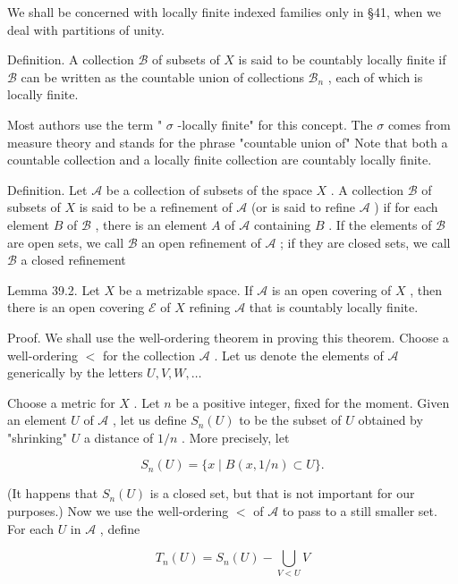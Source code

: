 \documentclass[10pt]{article}
\begin{document}
We shall be concerned with locally finite indexed families only in §41, when we deal with partitions of unity.

Definition. A collection \(\mathcal{B}\) of subsets of \(X\) is said to be countably locally finite if \(\mathcal{B}\) can be written as the countable union of collections \({\mathcal{B}}_{n}\) , each of which is locally finite.

Most authors use the term " \(\sigma\) -locally finite" for this concept. The \(\sigma\) comes from measure theory and stands for the phrase "countable union of" Note that both a countable collection and a locally finite collection are countably locally finite.

Definition. Let \(\mathcal{A}\) be a collection of subsets of the space \(X\) . A collection \(\mathcal{B}\) of subsets of \(X\) is said to be a refinement of \(\mathcal{A}\) (or is said to refine \(\mathcal{A}\) ) if for each element \(B\) of \(\mathcal{B}\) , there is an element \(A\) of \(\mathcal{A}\) containing \(B\) . If the elements of \(\mathcal{B}\) are open sets, we call \(\mathcal{B}\) an open refinement of \(\mathcal{A}\) ; if they are closed sets, we call \(\mathcal{B}\) a closed refinement

Lemma 39.2. Let \(X\) be a metrizable space. If \(\mathcal{A}\) is an open covering of \(X\) , then there is an open covering \(\mathcal{E}\) of \(X\) refining \(\mathcal{A}\) that is countably locally finite.

Proof. We shall use the well-ordering theorem in proving this theorem. Choose a well-ordering \(<\) for the collection \(\mathcal{A}\) . Let us denote the elements of \(\mathcal{A}\) generically by the letters \(U,V,W,\ldots\)

Choose a metric for \(X\) . Let \(n\) be a positive integer, fixed for the moment. Given an element \(U\) of \(\mathcal{A}\) , let us define \({S}_{n}\left( U\right)\) to be the subset of \(U\) obtained by "shrinking" \(U\) a distance of \(1/n\) . More precisely, let

\[
{S}_{n}\left( U\right)  = \{ x \mid  B\left( {x,1/n}\right)  \subset  U\} .
\]

(It happens that \({S}_{n}\left( U\right)\) is a closed set, but that is not important for our purposes.) Now we use the well-ordering \(<\) of \(\mathcal{A}\) to pass to a still smaller set. For each \(U\) in \(\mathcal{A}\) , define

\[
{T}_{n}\left( U\right)  = {S}_{n}\left( U\right)  - \mathop{\bigcup }\limits_{{V < U}}V
\]
\end{document}
